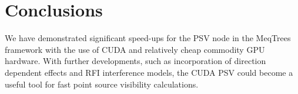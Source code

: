 \section{Conclusions}

We have demonstrated significant speed-ups for the PSV node in the MeqTrees framework with the use of  CUDA and relatively cheap commodity GPU hardware. With further developments, such as  incorporation of direction dependent effects and RFI interference models, the CUDA PSV could become a useful tool for fast point source visibility calculations.



